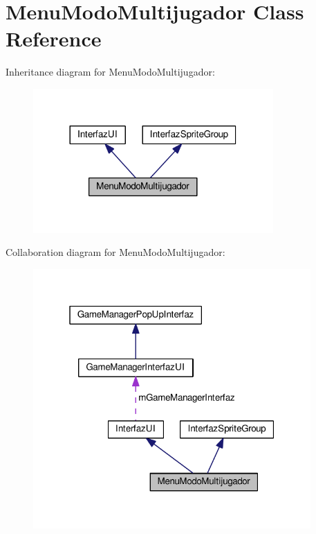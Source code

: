 \hypertarget{class_menu_modo_multijugador}{}\section{Menu\+Modo\+Multijugador Class Reference}
\label{class_menu_modo_multijugador}


Inheritance diagram for Menu\+Modo\+Multijugador\+:\nopagebreak
\begin{figure}[H]
\begin{center}
\leavevmode
\includegraphics[width=260pt]{class_menu_modo_multijugador__inherit__graph}
\end{center}
\end{figure}


Collaboration diagram for Menu\+Modo\+Multijugador\+:\nopagebreak
\begin{figure}[H]
\begin{center}
\leavevmode
\includegraphics[width=301pt]{class_menu_modo_multijugador__coll__graph}
\end{center}
\end{figure}
